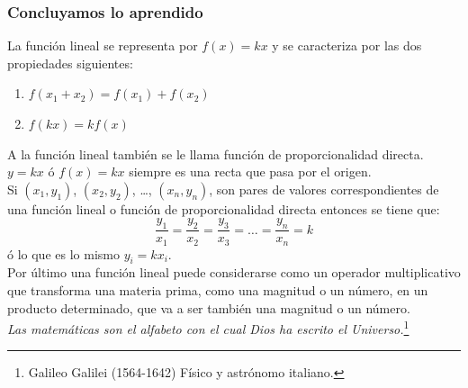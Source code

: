 \documentclass[10pt]{article}
\begin{document}
\subsubsection*{Concluyamos lo aprendido}
La función lineal se representa por $f(x) = kx$ y se caracteriza por las dos propiedades siguientes:
\begin{enumerate}
\item $f(x_{1}+x_{2})=f(x_{1})+f(x_{2})$
\item $f(kx)=kf(x)$
\end{enumerate}
A la función lineal también se le llama función de proporcionalidad directa. $y = kx$ ó $f(x) = kx$ siempre es una recta que pasa por el origen.\\

Si $(x_{1},y_{1})$, $(x_{2},y_{2})$, \ldots, $(x_{n},y_{n})$, son pares de valores correspondientes de una función lineal o función de proporcionalidad directa entonces se tiene que:
\[\dfrac{y_{1}}{x_{1}}=\dfrac{y_{2}}{x_{2}}=\dfrac{y_{3}}{x_{3}}=\ldots=\dfrac{y_{n}}{x_{n}}=k\]
ó lo que es lo mismo $y_i = kx_i$.\\

Por último una función lineal puede considerarse como un operador multiplicativo que transforma una materia prima, como una magnitud o un número, en un producto determinado, que va a ser también una magnitud o un número.\\

\emph{Las matemáticas son el alfabeto con el cual Dios ha escrito el Universo.}\footnote{Galileo Galilei (1564-1642) Físico y astrónomo italiano.}
\end{document}
